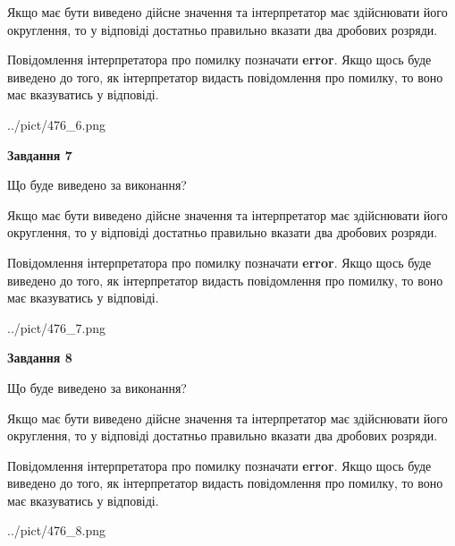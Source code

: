 \documentclass[12pt, ukrainian]{article}
\begin{document}
{\begin {Large}
Якщо має бути виведено дійсне значення та інтерпретатор має здійснювати його округлення, 
то у відповіді достатньо правильно вказати два дробових розряди.

Повідомлення інтерпретатора про помилку позначати \textbf{error}.
Якщо щось буде виведено до того, як інтерпретатор видасть повідомлення про помилку, 
то воно має вказуватись у відповіді. \par

\begin{center}
	{../pict/476_6.png}
\end{center}
\newpage

{\begin {center}\textbf{Завдання 7}\end {center}}\par
Що буде виведено за виконання? \par

Якщо має бути виведено дійсне значення та інтерпретатор має здійснювати його округлення, 
то у відповіді достатньо правильно вказати два дробових розряди.

Повідомлення інтерпретатора про помилку позначати \textbf{error}.
Якщо щось буде виведено до того, як інтерпретатор видасть повідомлення про помилку, 
то воно має вказуватись у відповіді. \par

\begin{center}
	{../pict/476_7.png}
\end{center}
\newpage

{\begin {center}\textbf{Завдання 8}\end {center}}\par
Що буде виведено за виконання? \par

Якщо має бути виведено дійсне значення та інтерпретатор має здійснювати його округлення, 
то у відповіді достатньо правильно вказати два дробових розряди.

Повідомлення інтерпретатора про помилку позначати \textbf{error}.
Якщо щось буде виведено до того, як інтерпретатор видасть повідомлення про помилку, 
то воно має вказуватись у відповіді. \par

\begin{center}
	{../pict/476_8.png}
\end{center}
\newpage


\end{Large}}
\end{document}

